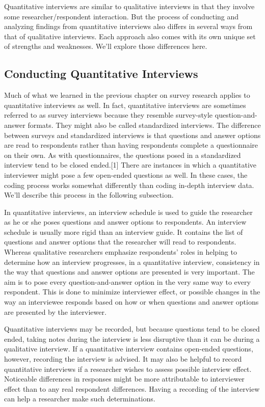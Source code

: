 Quantitative interviews are similar to qualitative interviews in that they involve some researcher/respondent interaction. But the process of conducting and analyzing findings from quantitative interviews also differs in several ways from that of qualitative interviews. Each approach also comes with its own unique set of strengths and weaknesses. We’ll explore those differences here.

\subsection{Conducting Quantitative Interviews}

Much of what we learned in the previous chapter on survey research applies to quantitative interviews as well. In fact, quantitative interviews are sometimes referred to as survey interviews because they resemble survey-style question-and-answer formats. They might also be called standardized interviews. The difference between surveys and standardized interviews is that questions and answer options are read to respondents rather than having respondents complete a questionnaire on their own. As with questionnaires, the questions posed in a standardized interview tend to be closed ended.[1] There are instances in which a quantitative interviewer might pose a few open-ended questions as well. In these cases, the coding process works somewhat differently than coding in-depth interview data. We’ll describe this process in the following subsection.

In quantitative interviews, an interview schedule is used to guide the researcher as he or she poses questions and answer options to respondents. An interview schedule is usually more rigid than an interview guide. It contains the list of questions and answer options that the researcher will read to respondents. Whereas qualitative researchers emphasize respondents’ roles in helping to determine how an interview progresses, in a quantitative interview, consistency in the way that questions and answer options are presented is very important. The aim is to pose every question-and-answer option in the very same way to every respondent. This is done to minimize interviewer effect, or possible changes in the way an interviewee responds based on how or when questions and answer options are presented by the interviewer.

Quantitative interviews may be recorded, but because questions tend to be closed ended, taking notes during the interview is less disruptive than it can be during a qualitative interview. If a quantitative interview contains open-ended questions, however, recording the interview is advised. It may also be helpful to record quantitative interviews if a researcher wishes to assess possible interview effect. Noticeable differences in responses might be more attributable to interviewer effect than to any real respondent differences. Having a recording of the interview can help a researcher make such determinations.

